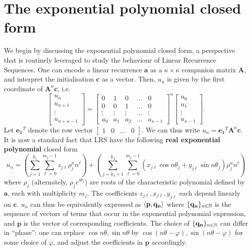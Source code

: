 \section{The exponential polynomial closed form}
\label{section:solspace}
We begin by discussing the exponential polynomial closed form, a perspective that is routinely leveraged to study the behaviour of Linear Recurrence Sequences. One can encode a linear recurrence $\mathbf{a}$ as a $\kappa \times \kappa$ companion matrix $\mathbf{A}$, and interpret the initialisation $\mathbf{c}$ as a vector. Then, $u_n$ is given by the first coordinate of $\mathbf{A}^n\mathbf{c}$, i.e.
\begin{equation}
\label{eq:companion}
\begin{bmatrix}
u_n \\
u_{n+1} \\
\vdots \\
u_{n+\kappa-1}
\end{bmatrix} 
= 
\begin{bmatrix}
0 & 1 & 0 & \dots & 0 \\
0 & 0 & 1 & \dots & 0 \\
\vdots & \vdots & \vdots & \dots & \vdots \\
a_0 & a_1 & a_2 & \dots & a_{\kappa-1}
\end{bmatrix}^n
\begin{bmatrix}
u_0 \\
u_{1} \\
\vdots \\
u_{\kappa-1}
\end{bmatrix}.
\end{equation}
Let $\mathbf{e_1}^T$ denote the row vector $\begin{bmatrix}1 & 0 & \dots & 0\end{bmatrix}$. We can thus write $u_n = \mathbf{e_1}^T\mathbf{A}^n\mathbf{c}$. It is now a standard fact that LRS have the following \textbf{real exponential polynomial} closed form 
\begin{equation}
\label{eq:realexppoly}
u_n = \left(\sum_{j=1}^{k_1}\sum_{\ell = 0}^{m_j-1} z_{j\ell}\rho_j^n n^\ell\right) + \left(\sum_{j=k_1 + 1}^{k_2} \sum_{\ell = 0}^{m_j-1} (x_{j\ell} \cos n\theta_j + y_{j\ell}\sin n\theta_j)\rho_j^n n^\ell\right)
\end{equation}
where $\rho_j$ (alternately, $\rho_j e^{i\theta_j}$) are roots of the characteristic polynomial defined by $\mathbf{a}$, each with multiplicity $m_j$. The coefficients $z_{j\ell}, x_{j\ell}, y_{j\ell}$ each depend linearly on $\mathbf{c}$. $u_n$ can thus be equivalently expressed as $\langle\mathbf{p}, \mathbf{q_n}\rangle$ where $\{\mathbf{q_n}\}_{n\in \mathbb{N}}$ is the sequence of vectors of terms that occur in the exponential polynomial expression, and $\mathbf{p}$ is the vector of corresponding coefficients. The choice of $\{\mathbf{q_n}\}_{n\in \mathbb{N}}$ can differ in ``phase'': one can replace $\cos n\theta, \sin n\theta$ by $\cos (n\theta-\varphi), \sin(n\theta-\varphi)$ for some choice of $\varphi$, and adjust the coefficients in $\mathbf{p}$ accordingly.

